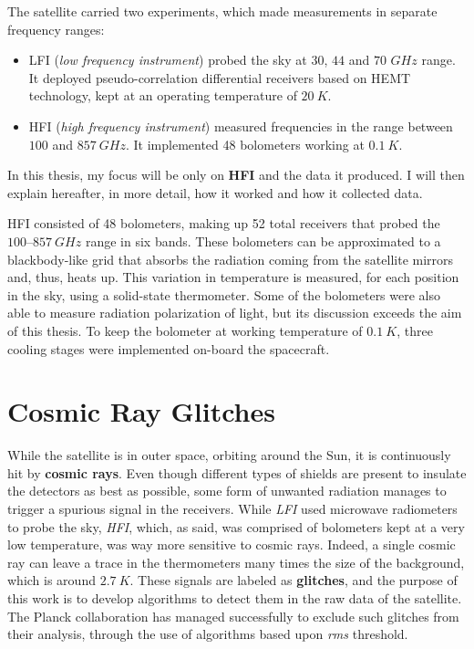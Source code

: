 \documentclass[12pt,a4paper,final]{book}			%
\begin{document}
			The satellite carried two experiments, which made measurements in separate frequency ranges:
				\begin{itemize}
					\item LFI (\textit{low frequency instrument}) probed the sky at $30$, $44$ and $70$ $\unit{GHz}$ range. It deployed pseudo-correlation differential receivers based on HEMT technology, kept at an operating temperature of $20 ~\unit{K}$.
					\item HFI (\textit{high frequency instrument}) measured frequencies in the range between $100$ and $857~\unit{GHz}$. It implemented 48 bolometers working at $0.1~\unit{K}$.
				\end{itemize}
				In this thesis, my focus will be only on \textbf{HFI} and the data it produced. I will then explain hereafter, in more detail, how it worked and how it collected data.\cite{tesi_tomasi}					
				
				HFI consisted of 48 bolometers, making up 52 total receivers that probed the $100–857~\unit{GHz}$ range in six bands. These bolometers can be approximated to a blackbody-like grid that absorbs the radiation coming from the satellite mirrors and, thus, heats up. This variation in temperature is measured, for each position in the sky, using a solid-state thermometer. 
				Some of the bolometers were also able to measure radiation polarization of light, but its discussion exceeds the aim of this thesis.
				To keep the bolometer at working temperature of $0.1~\unit{K}$, three cooling stages were implemented on-board the spacecraft.
		\section{Cosmic Ray Glitches}\label{cosmic_ray_glitches}
			While the satellite is in outer space, orbiting around the Sun, it is continuously hit by \textbf{cosmic rays}. Even though different types of shields are present to insulate the detectors as best as possible, some form of unwanted radiation manages to trigger a spurious signal in the receivers.
			While \textit{LFI} used microwave radiometers to probe the sky, \textit{HFI}, which, as said, was comprised of bolometers kept at a very low temperature, was way more sensitive to cosmic rays. Indeed, a single cosmic ray can leave a trace in the thermometers many times the size of the background, which is around $2.7~\unit{K}$.
			These signals are labeled as \textbf{glitches}, and the purpose of this work is to develop algorithms to detect them in the raw data of the satellite. 
									The Planck collaboration has managed successfully to exclude such glitches from their analysis, through the use of algorithms based upon \textit{rms} threshold. \cite{planck_glitches}
									
\end{document}
